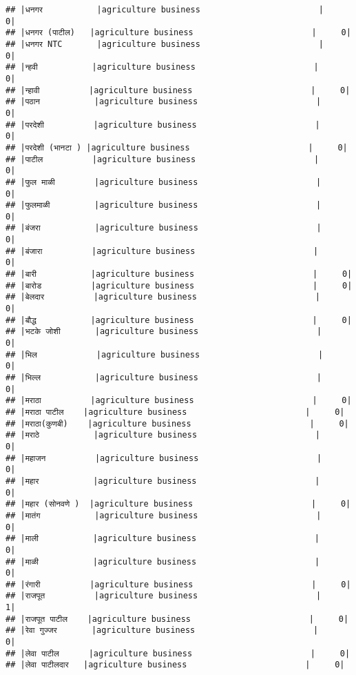 \documentclass[
]{article}
\begin{document}
\begin{verbatim}
## |धनगर           |agriculture business                        |     0|
## |धनगर (पाटील)   |agriculture business                        |     0|
## |धनगर NTC       |agriculture business                        |     0|
## |न्हवी           |agriculture business                        |     0|
## |न्हावी          |agriculture business                        |     0|
## |पठान           |agriculture business                        |     0|
## |परदेशी          |agriculture business                        |     0|
## |परदेशी (भानटा ) |agriculture business                        |     0|
## |पाटील          |agriculture business                        |     0|
## |फुल माळी        |agriculture business                        |     0|
## |फुलमाळी         |agriculture business                        |     0|
## |बंजरा           |agriculture business                        |     0|
## |बंजारा          |agriculture business                        |     0|
## |बारी           |agriculture business                        |     0|
## |बारोड          |agriculture business                        |     0|
## |बेलदार          |agriculture business                        |     0|
## |बौद्ध           |agriculture business                        |     0|
## |भटके जोशी       |agriculture business                        |     0|
## |भिल            |agriculture business                        |     0|
## |भिल्ल           |agriculture business                        |     0|
## |मराठा          |agriculture business                        |     0|
## |मराठा पाटील    |agriculture business                        |     0|
## |मराठा(कुणबी)    |agriculture business                        |     0|
## |मराठे           |agriculture business                        |     0|
## |महाजन          |agriculture business                        |     0|
## |महार           |agriculture business                        |     0|
## |महार (सोनवणे )  |agriculture business                        |     0|
## |मातंग           |agriculture business                        |     0|
## |माली           |agriculture business                        |     0|
## |माळी           |agriculture business                        |     0|
## |रंगारी          |agriculture business                        |     0|
## |राजपूत          |agriculture business                        |     1|
## |राजपूत पाटील    |agriculture business                        |     0|
## |रेवा गुज्जर       |agriculture business                        |     0|
## |लेवा पाटील      |agriculture business                        |     0|
## |लेवा पाटीलदार   |agriculture business                        |     0|

\end{verbatim}
\end{document}
